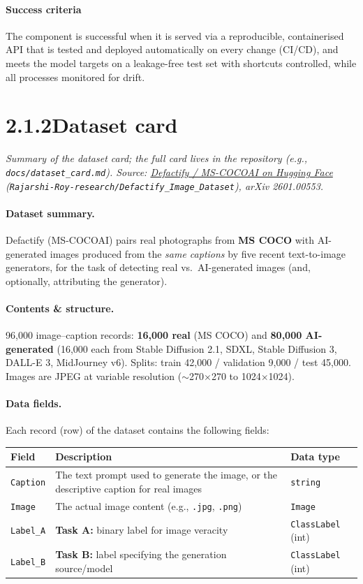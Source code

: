 \documentclass[11pt]{article}
\begin{document}
\paragraph{Success criteria} The component is successful when it is served via a reproducible, containerised API that is tested and deployed automatically on every change (CI/CD), and meets the model targets on a leakage-free test set with shortcuts controlled, while all processes monitored for drift.


\newpage
\section*{2.1.2\quad Dataset card}
\textit{Summary of the dataset card; the full card lives in the repository (e.g., \texttt{docs/dataset\_card.md}). Source: \href{https://huggingface.co/datasets/Rajarshi-Roy-research/Defactify_Image_Dataset}{Defactify / MS-COCOAI on Hugging Face} (\texttt{Rajarshi-Roy-research/Defactify\_Image\_Dataset}), arXiv 2601.00553.}

\paragraph{Dataset summary.} Defactify (MS-COCOAI) pairs real photographs from \textbf{MS COCO} with AI-generated images produced from the \emph{same captions} by five recent text-to-image generators, for the task of detecting real vs.\ AI-generated images (and, optionally, attributing the generator).

\paragraph{Contents \& structure.} 96{,}000 image--caption records: \textbf{16{,}000 real} (MS COCO) and \textbf{80{,}000 AI-generated} (16{,}000 each from Stable Diffusion 2.1, SDXL, Stable Diffusion 3, DALL-E 3, MidJourney v6). Splits: train 42{,}000 / validation 9{,}000 / test 45{,}000. Images are JPEG at variable resolution ($\sim$270$\times$270 to 1024$\times$1024).

\paragraph{Data fields.} Each record (row) of the dataset contains the following fields:

\smallskip
\noindent\begin{tabularx}{\textwidth}{@{}l Y l@{}}
\toprule
\textbf{Field} & \textbf{Description} & \textbf{Data type} \\
\midrule
\texttt{Caption} & The text prompt used to generate the image, or the descriptive caption for real images & \texttt{string} \\
\texttt{Image} & The actual image content (e.g., \texttt{.jpg}, \texttt{.png}) & \texttt{Image} \\
\texttt{Label\_A} & \textbf{Task A:} binary label for image veracity & \texttt{ClassLabel} (int) \\
\texttt{Label\_B} & \textbf{Task B:} label specifying the generation source/model & \texttt{ClassLabel} (int) \\
\bottomrule
\end{tabularx}
\end{document}
